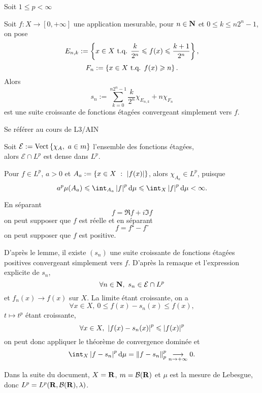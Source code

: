 \documentclass[a4paper,11pt, twoside]{article}
\begin{document}


Soit $1\leqslant p< \infty$


\begin{lemme}
  Soit $f:X\longrightarrow[0,+\infty]$ une application mesurable, pour $n\in\mathbf N$ et $0\leqslant k\leqslant n2^n-1$, on pose 
  $$E_{n,k}:=\left\{x\in X\text{ t.q. }\frac{k}{2^n}\leqslant f(x)\leqslant \frac{k+1}{2^n}\right\},$$
  $$F_n:=\left\{x\in X\text{ t.q. } f(x)\geqslant n\right\}.$$
  Alors
  $$s_n:=\sum_{k=0}^{n2^n-1}\frac{k}{2^n}\chi_{E_{n,k}}+n\chi_{F_n}$$
  est une suite croissante de fonctions étagées convergeant simplement vers $f$.
\end{lemme}


\begin{Proof}
  Se référer au cours de L3/AIN
\end{Proof}

\begin{corollaire}
  Soit $\mathcal E:=\mathrm{Vect}\left\{\chi_A,\ a\in m\right\}$ l'ensemble des fonctions étagées,\\

  alors $\mathcal E\cap L^p$ est dense dans $L^p$.
\end{corollaire}


\begin{RQ}
  Pour $f\in L^p$, $a>0$ et $A_a:=\left\{x\in X\ :\ \left| f(x)\right|\right\}$, alors $\chi_{A_a}\in L^p$, puisque 
  $$a^p\mu(A_a)\leqslant\int_{A_a}\abs{f}^p\mathrm d\mu\leqslant \int_{X}\abs{f}^p\mathrm d\mu<\infty.$$
\end{RQ}


\begin{Proof}
  En séparant 
  $$f=\Re f+i\Im f$$
  on peut supposer que $f$ est réelle et en séparant 
  $$f=f⁺-f⁻$$
  on peut supposer que $f$ est positive.

  D'après le lemme, il existe $(s_n)$ une suite croissante de fonctions étagées positives convergeant simplement vers $f$. D'après la remaque et l'expression explicite de $s_n$, 
  $$\forall n\in\mathbf N,\ s_n\in \mathcal E\cap L^p$$
  et $f_n(x)\longrightarrow f(x)$ sur $X$. 
  La limite étant croissante, on a 
  $$\forall x\in X,\ 0\leqslant f(x)-s_n(x)\leqslant f(x),$$
  $t\mapsto t^p$ étant croissante,
  $$\forall x\in X,\ \abs{f(x)-s_n(x)}^p\leqslant \abs{f(x)}^p$$
  on peut donc appliquer le théorème de convergence dominée et 
  $$\int_X\abs{f-s_n}^p\mathrm d\mu=\norm{f-s_n}_p^p\tend 0.$$
\end{Proof}


Dans la suite du document, $X=\mathbf R$, $m=\mathcal B(\mathbf R)$ et $\mu$ est la mesure de Lebesgue, donc $L^p=L^p(\mathbf R,\mathcal B(\mathbf R),\lambda)$.
\end{document}
